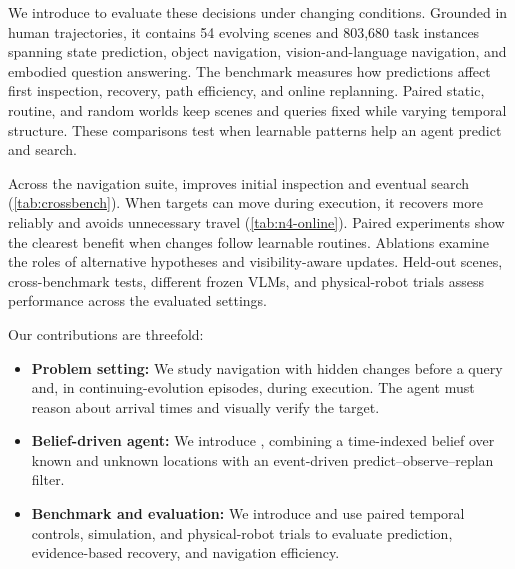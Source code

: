 We introduce \textbf{\evolvingworldbench{}} to evaluate these decisions under changing conditions. 
Grounded in human trajectories, it contains 54 evolving scenes and 803,680 task instances spanning state prediction, object navigation, vision-and-language navigation, and embodied question answering. 
The benchmark measures how predictions affect first inspection, recovery, path efficiency, and online replanning. Paired static, routine, and random worlds keep scenes and queries fixed while varying temporal structure. 
These comparisons test when learnable patterns help an agent predict and search.

Across the navigation suite, \textbf{\evolvingworldnav{}} improves initial inspection and eventual search (\cref{tab:crossbench}). 
When targets can move during execution, it recovers more reliably and avoids unnecessary travel (\cref{tab:n4-online}). 
Paired experiments show the clearest benefit when changes follow learnable routines. 
Ablations examine the roles of alternative hypotheses and visibility-aware updates. 
Held-out scenes, cross-benchmark tests, different frozen VLMs, and physical-robot trials assess performance across the evaluated settings.

Our contributions are threefold:
\begin{itemize}[leftmargin=*,itemsep=0.6mm,topsep=1mm]
    \item \textbf{Problem setting:} We study navigation with hidden changes before a query and, in continuing-evolution episodes, during execution. 
    The agent must reason about arrival times and visually verify the target.
    \item \textbf{Belief-driven agent:} We introduce \textbf{\evolvingworldnav{}}, combining a time-indexed belief over known and unknown locations with an event-driven predict--observe--replan filter.
    \item \textbf{Benchmark and evaluation:} We introduce \textbf{\evolvingworldbench{}} and use paired temporal controls, simulation, and physical-robot trials to evaluate prediction, evidence-based recovery, and navigation efficiency.
\end{itemize}



